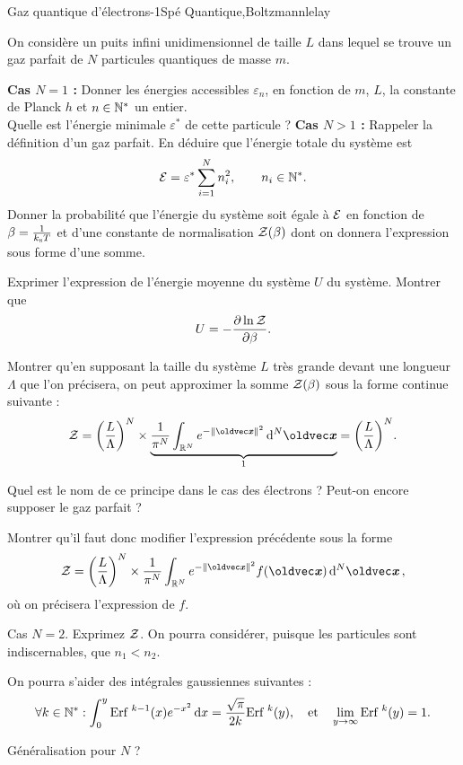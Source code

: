 \begin{exercise}{Gaz quantique d'électrons}{-1}{Spé}
{Quantique,Boltzmann}{lelay}

On considère un puits infini unidimensionnel de taille $L$ dans lequel se trouve un gaz parfait de $N$ particules quantiques de masse $m$.

\begin{questions}
    \question \textbf{Cas $N = 1$ :} Donner les énergies accessibles $\varepsilon_n$, en fonction de $m$, $L$, la constante de Planck $h$ et $n\in\mbb{N}^\ast$ un entier. \\
    Quelle est l'énergie minimale $\varepsilon^\ast$ de cette particule ?
    \question \textbf{Cas $N > 1$ :} Rappeler la définition d'un gaz parfait. En déduire que l'énergie totale du système est
    $$\En = \varepsilon^\ast\sum_{i=1}^{N} n_i^2, \qquad n_i\in\mbb{N}^\ast.$$
    \question Donner la probabilité que l'énergie du système soit égale à $\En$ en fonction de $\beta = \frac{1}{k_\textsc{b}T}$ et d'une constante de normalisation $\cal{Z}(\beta)$ dont on donnera l'expression sous forme d'une somme.
    
    \question Exprimer l'expression de l'énergie moyenne du système $U$ du système. Montrer que
    $$U = -\pdv{\ln\cal{Z}}{\beta}.$$
    
    \question Montrer qu'en supposant la taille du système $L$ très grande devant une longueur $\Lambda$ que l'on précisera, on peut approximer la somme $\cal{Z}(\beta)$ sous la forme continue suivante :
    $$\cal{Z} = \qty(\dfrac{L}{\Lambda})^{N}\times \underset{1}{\underbrace{\dfrac{1}{\pi^{N}}\int_{\mbb{R}^{N}} e^{-\norm{\vec{x}}^2} \dd[N]{\vec{x}}}} = \qty(\dfrac{L}{\Lambda})^{N}.$$
    
    
    \question Quel est le nom de ce principe dans le cas des électrons ? Peut-on encore supposer le gaz parfait ?
    
    \question Montrer qu'il faut donc modifier l'expression précédente sous la forme
    $$\cal{Z} = \qty(\dfrac{L}{\Lambda})^{N}\times \dfrac{1}{\pi^{N}}\int_{\mbb{R}^{N}} e^{-\norm{\vec{x}}^2} f(\vx) \dd[N]{\vec{x}},$$
    où on précisera l'expression de $f$.
    
    \question Cas $N=2$. Exprimez $\cal{Z}$. On pourra considérer, puisque les particules sont indiscernables, que $n_1 < n_2$.
    
    On pourra s'aider des intégrales gaussiennes suivantes :
    $$\forall k\in\mbb{N}^\ast : \int_0^y \text{Erf }^{k-1}(x) e^{- x^2}\dd{x} = \dfrac{\sqrt{\pi}}{2k}\text{Erf }^k(y), \qqtext{et} \lim_{y\rightarrow\infty}\text{Erf }^k(y) = 1.$$
    
    \question Généralisation pour $N$ ?

    
\end{questions}

\end{exercise}